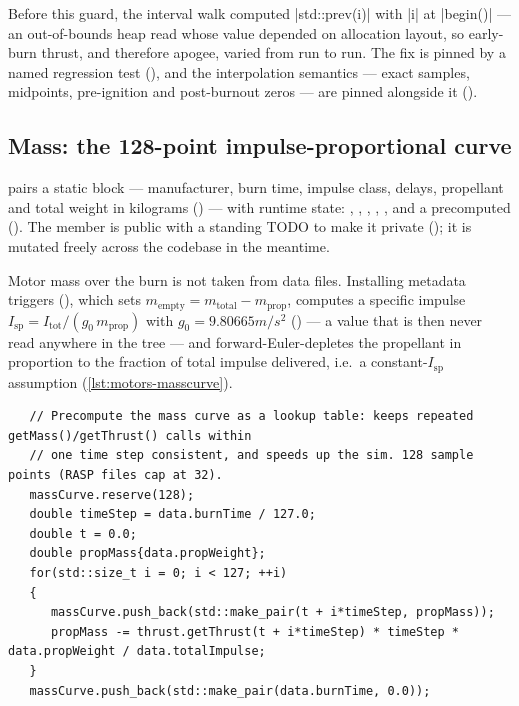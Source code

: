 \begin{keyinsight}
Before this guard, the interval walk computed \cppinline|std::prev(i)| with \cppinline|i| at
\cppinline|begin()| --- an out-of-bounds heap read whose value depended on allocation layout, so
early-burn thrust, and therefore apogee, varied from run to run. The fix is pinned by a named
regression test (), and the interpolation semantics ---
exact samples, midpoints, pre-ignition and post-burnout zeros --- are pinned alongside it
(). \ok
\end{keyinsight}

\subsection{Mass: the 128-point impulse-proportional curve}\label{sec:motors-mass}

 pairs a static  block --- manufacturer, burn time, impulse class,
delays, propellant and total weight in kilograms () --- with runtime
state: , , , ,
, and a precomputed  (). The
 member is public with a standing TODO to make it private
(); it is mutated freely across the codebase in the meantime.

Motor mass over the burn is not taken from data files. Installing metadata triggers
 (), which sets
$m_{\text{empty}} = m_{\text{total}} - m_{\text{prop}}$, computes a specific impulse
$I_{\mathrm{sp}} = I_{\text{tot}} / (g_0\, m_{\text{prop}})$ with
$g_0 = 9.80665\unit{m/s^2}$ () --- a value that is then never read
anywhere in the tree --- and forward-Euler-depletes the propellant in proportion to the fraction of
total impulse delivered, i.e.\ a constant-$I_{\mathrm{sp}}$ assumption
(\cref{lst:motors-masscurve}).

\begin{listing}[htbp]
\begin{verbatim}
   // Precompute the mass curve as a lookup table: keeps repeated getMass()/getThrust() calls within
   // one time step consistent, and speeds up the sim. 128 sample points (RASP files cap at 32).
   massCurve.reserve(128);
   double timeStep = data.burnTime / 127.0;
   double t = 0.0;
   double propMass{data.propWeight};
   for(std::size_t i = 0; i < 127; ++i)
   {
      massCurve.push_back(std::make_pair(t + i*timeStep, propMass));
      propMass -= thrust.getThrust(t + i*timeStep) * timeStep * data.propWeight / data.totalImpulse;
   }
   massCurve.push_back(std::make_pair(data.burnTime, 0.0));
\end{verbatim}
\caption{ resamples the thrust integral into a 128-point propellant
lookup table ().}
\label{lst:motors-masscurve}
\end{listing}

